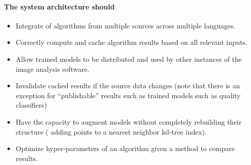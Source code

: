     \paragraph{The system architecture should}
    \begin{itemize}

        \item Integrate of algorithms from multiple sources across
          multiple languages.

        \item Correctly compute and cache algorithm results based on
          all relevant inputs.

        \item Allow trained models to be distributed and used by other
          instances of the image analysis software.

        \item Invalidate cached results if the source data changes
          (note that there is an exception for ``publishable'' results
          such as trained models such as quality classifiers)

        \item Have the capacity to augment models without completely
          rebuilding their structure (\eg{} adding points to a nearest
          neighbor kd-tree index).

        \item Optimize hyper-parameters of an algorithm given a method
          to compare results.

    \end{itemize}


